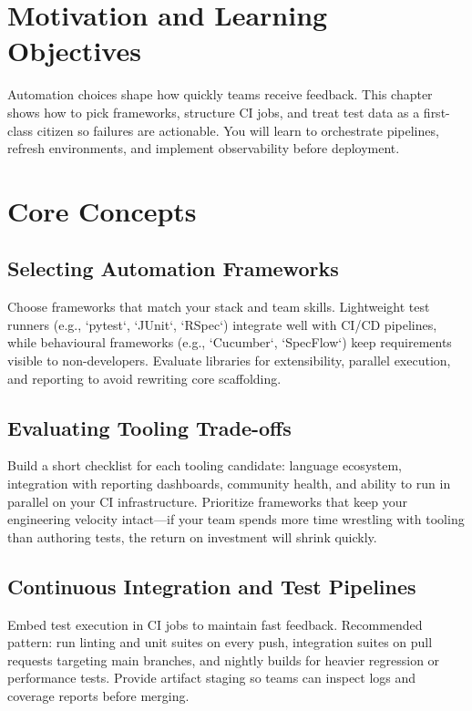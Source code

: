 \section{Motivation and Learning Objectives}

Automation choices shape how quickly teams receive feedback. This chapter shows how to pick frameworks, structure CI jobs, and treat test data as a first-class citizen so failures are actionable. You will learn to orchestrate pipelines, refresh environments, and implement observability before deployment.

\section{Core Concepts}

\subsection{Selecting Automation Frameworks}

Choose frameworks that match your stack and team skills. Lightweight test runners (e.g., `pytest`, `JUnit`, `RSpec`) integrate well with CI/CD pipelines, while behavioural frameworks (e.g., `Cucumber`, `SpecFlow`) keep requirements visible to non-developers. Evaluate libraries for extensibility, parallel execution, and reporting to avoid rewriting core scaffolding.

\subsection{Evaluating Tooling Trade-offs}

Build a short checklist for each tooling candidate: language ecosystem, integration with reporting dashboards, community health, and ability to run in parallel on your CI infrastructure. Prioritize frameworks that keep your engineering velocity intact—if your team spends more time wrestling with tooling than authoring tests, the return on investment will shrink quickly.

\subsection{Continuous Integration and Test Pipelines}

Embed test execution in CI jobs to maintain fast feedback. Recommended pattern: run linting and unit suites on every push, integration suites on pull requests targeting main branches, and nightly builds for heavier regression or performance tests. Provide artifact staging so teams can inspect logs and coverage reports before merging.

